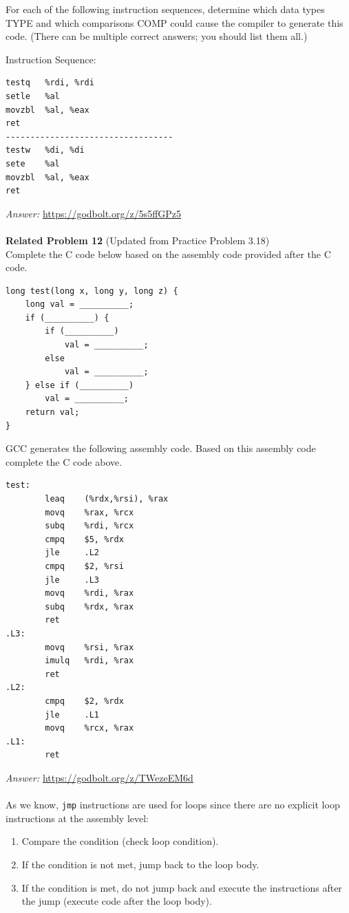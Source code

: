 \documentclass{article}
\begin{document}
\noindent For each of the following instruction sequences, determine which data 
types TYPE and which comparisons COMP could cause the compiler to 
generate this code. (There can be multiple correct answers; you should 
list them all.)

\noindent Instruction Sequence:
\begin{verbatim}
testq   %rdi, %rdi
setle   %al
movzbl  %al, %eax
ret
----------------------------------
testw   %di, %di
sete    %al
movzbl  %al, %eax
ret
\end{verbatim}

\noindent\textit{Answer: }\url{https://godbolt.org/z/5s5ffGPz5} \\
\\
\noindent\textbf{Related Problem 12} (Updated from Practice Problem 3.18) \\

Complete the C code below based on the assembly code provided after the C code.

\begin{verbatim}
long test(long x, long y, long z) {
    long val = __________;
    if (__________) {
        if (__________)
            val = __________;
        else
            val = __________;
    } else if (__________)
        val = __________;
    return val;
}
\end{verbatim}
GCC generates the following assembly code. Based on this assembly code complete the C code above.
\begin{verbatim}
test:
        leaq    (%rdx,%rsi), %rax
        movq    %rax, %rcx
        subq    %rdi, %rcx
        cmpq    $5, %rdx
        jle     .L2
        cmpq    $2, %rsi
        jle     .L3
        movq    %rdi, %rax
        subq    %rdx, %rax
        ret
.L3:
        movq    %rsi, %rax
        imulq   %rdi, %rax
        ret
.L2:
        cmpq    $2, %rdx
        jle     .L1
        movq    %rcx, %rax
.L1:
        ret
\end{verbatim}

\noindent\textit{Answer: }\url{https://godbolt.org/z/TWezeEM6d} \\
\\
As we know, \texttt{jmp} instructions are used for loops since there are no explicit loop instructions at the assembly level:

\begin{enumerate}
    \item Compare the condition (check loop condition).
    \item If the condition is not met, jump back to the loop body.
    \item If the condition is met, do not jump back and execute the instructions after the jump (execute code after the loop body).
\end{enumerate}
\end{document}
